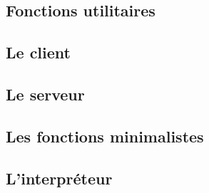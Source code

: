 \documentclass[a4paper, 11pt]{article}
\begin{document}
\newpage
\subsection*{Fonctions utilitaires}


\newpage
\subsection*{Le client}


\newpage
\subsection*{Le serveur}


\newpage
\subsection*{Les fonctions minimalistes}


\newpage
\subsection*{L'interpréteur}

\end{document}

